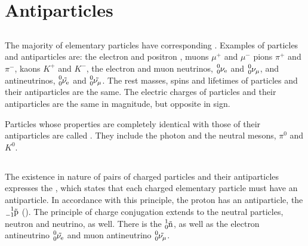 \section{Antiparticles}
\label{sec-43.5} 


\subsection{}\label{43.5.1} The majority of elementary particles have corresponding . Examples of particles and antiparticles are: the electron  and positron , muons $\mu^{+}$ and $\mu^{-}$ pions $\pi^{+}$ and $\pi^{-}$, kaons $K^{+}$ and $K^{-}$, the electron and muon neutrinos, $\ce{^{0}_{0}{\nu_{e}}}$ and $\ce{^{0}_{0}{\nu_{\mu}}}$, and antineutrinos, $\ce{^{0}_{0}\tilde{\nu_{e}}}$ and $\ce{^{0}_{0}\tilde{\nu_{\mu}}}$. The rest masses, spins
and lifetimes of particles and their antiparticles are the same. The electric charges of particles and their antiparticles are the same in magnitude, but opposite in sign.

Particles whose properties are completely identical with those of their antiparticles are called . They include the photon and the neutral mesons, $\pi^{0}$ and $K^{0}$.

\subsection{}\label{43.5.2} The existence in nature of pairs of charged particles and their antiparticles expresses the , which states that each charged elementary particle must have an antiparticle. In accordance with this principle, the proton has an antiparticle, the  $\ce{^{1}_{-1}\tilde{p}}$ (). The principle of charge conjugation extends to the neutral particles, neutron and neutrino, as well. There is the  $\ce{^{1}_{0}\tilde{n}}$, as well as the electron antineutrino $\ce{^{0}_{0}\tilde{\nu_{e}}}$ and muon antineutrino $\ce{^{0}_{0}\tilde{\nu_{\mu}}}$.

